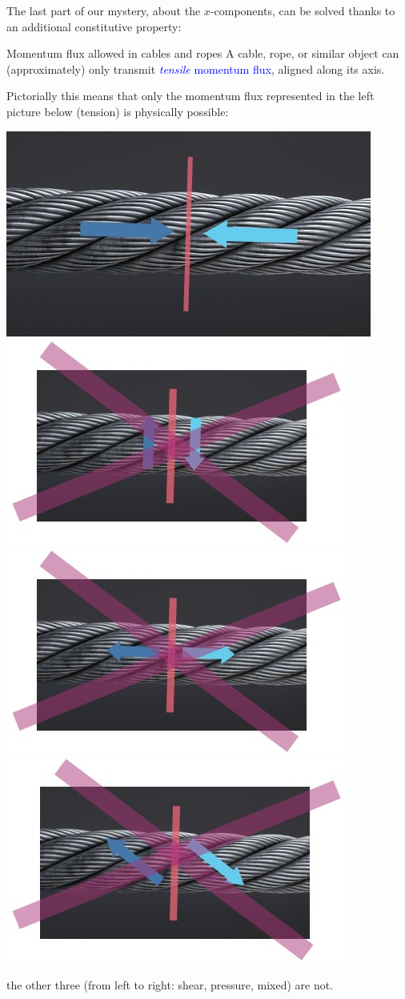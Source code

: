 \documentclass[a4paper,12pt,%
onecolumn,oneside,titlepage,%
british%
]{memoir}
\renewcommand*{\|}[1][]{\nonscript\:#1\vert\nonscript\:\mathopen{}}
\newcommand*{\sect}{\S}%
\renewcommand*{\autoref}[2]{\sidepar{\vspace{-1ex}\footnotesize{\color{blue}\faIcon{%
reply%
}\enspace\sect\,\ref{#1} page\,\pageref{#1}}}\textcolor{blue}{#2}}
\begin{document}
The last part of our mystery, about the $x$-components, can be solved thanks to an additional constitutive property:
\begin{definition}{{Momentum flux allowed in cables and ropes}}
  A cable, rope, or similar object can (approximately) only transmit \autoref{sec:tension}{\emph{tensile} momentum flux}, aligned along its axis.
\end{definition}
Pictorially this means that only the momentum flux represented in the left picture below (tension) is physically possible:
\begin{center}
\includegraphics[align=c,width=0.33\linewidth]{images/cabletension.jpg}%
\hfill
\includegraphics[align=c,width=0.22\linewidth]{images/cableshear.jpg}%
\includegraphics[align=c,width=0.22\linewidth]{images/cablepressure.jpg}%
\includegraphics[align=c,width=0.22\linewidth]{images/cablemix.jpg}%
\end{center}
the other three (from left to right: shear, pressure, mixed) are not.
\end{document}
